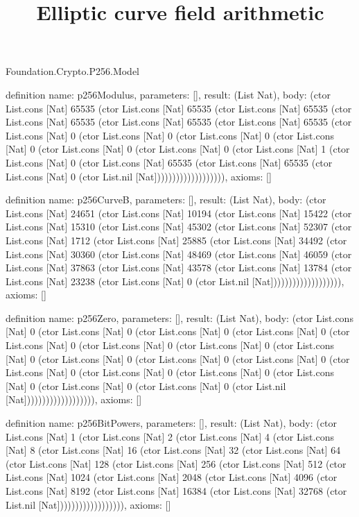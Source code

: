 \begin{lexlean}{Foundation.Crypto.P256.Model}
\title{Elliptic curve field arithmetic}
\begin{semanticmodule}
definition{
  name: p256Modulus,
  parameters: [],
  result: (List Nat),
  body: (ctor List.cons [Nat] 65535 (ctor List.cons [Nat] 65535 (ctor List.cons [Nat] 65535 (ctor List.cons [Nat] 65535 (ctor List.cons [Nat] 65535 (ctor List.cons [Nat] 65535 (ctor List.cons [Nat] 0 (ctor List.cons [Nat] 0 (ctor List.cons [Nat] 0 (ctor List.cons [Nat] 0 (ctor List.cons [Nat] 0 (ctor List.cons [Nat] 0 (ctor List.cons [Nat] 1 (ctor List.cons [Nat] 0 (ctor List.cons [Nat] 65535 (ctor List.cons [Nat] 65535 (ctor List.cons [Nat] 0 (ctor List.nil [Nat])))))))))))))))))),
  axioms: []
}

definition{
  name: p256CurveB,
  parameters: [],
  result: (List Nat),
  body: (ctor List.cons [Nat] 24651 (ctor List.cons [Nat] 10194 (ctor List.cons [Nat] 15422 (ctor List.cons [Nat] 15310 (ctor List.cons [Nat] 45302 (ctor List.cons [Nat] 52307 (ctor List.cons [Nat] 1712 (ctor List.cons [Nat] 25885 (ctor List.cons [Nat] 34492 (ctor List.cons [Nat] 30360 (ctor List.cons [Nat] 48469 (ctor List.cons [Nat] 46059 (ctor List.cons [Nat] 37863 (ctor List.cons [Nat] 43578 (ctor List.cons [Nat] 13784 (ctor List.cons [Nat] 23238 (ctor List.cons [Nat] 0 (ctor List.nil [Nat])))))))))))))))))),
  axioms: []
}

definition{
  name: p256Zero,
  parameters: [],
  result: (List Nat),
  body: (ctor List.cons [Nat] 0 (ctor List.cons [Nat] 0 (ctor List.cons [Nat] 0 (ctor List.cons [Nat] 0 (ctor List.cons [Nat] 0 (ctor List.cons [Nat] 0 (ctor List.cons [Nat] 0 (ctor List.cons [Nat] 0 (ctor List.cons [Nat] 0 (ctor List.cons [Nat] 0 (ctor List.cons [Nat] 0 (ctor List.cons [Nat] 0 (ctor List.cons [Nat] 0 (ctor List.cons [Nat] 0 (ctor List.cons [Nat] 0 (ctor List.cons [Nat] 0 (ctor List.cons [Nat] 0 (ctor List.nil [Nat])))))))))))))))))),
  axioms: []
}

definition{
  name: p256BitPowers,
  parameters: [],
  result: (List Nat),
  body: (ctor List.cons [Nat] 1 (ctor List.cons [Nat] 2 (ctor List.cons [Nat] 4 (ctor List.cons [Nat] 8 (ctor List.cons [Nat] 16 (ctor List.cons [Nat] 32 (ctor List.cons [Nat] 64 (ctor List.cons [Nat] 128 (ctor List.cons [Nat] 256 (ctor List.cons [Nat] 512 (ctor List.cons [Nat] 1024 (ctor List.cons [Nat] 2048 (ctor List.cons [Nat] 4096 (ctor List.cons [Nat] 8192 (ctor List.cons [Nat] 16384 (ctor List.cons [Nat] 32768 (ctor List.nil [Nat]))))))))))))))))),
  axioms: []
}


\end{semanticmodule}
\end{lexlean}
